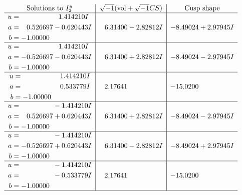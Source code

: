 \documentclass[1p]{elsarticle_modified}
\theoremstyle{definition}
\newcommand{\I}{\sqrt{-1}}
\begin{document}
$$\begin{array}{c|c|c}  
\text{Solutions to }I^u_{2}& \I (\text{vol} + \sqrt{-1}CS) & \text{Cusp shape}\\
 \hline 
\begin{aligned}
u &= \phantom{-0.000000 -}1.414210 I \\
a &= \phantom{-}0.526697 - 0.620443 I \\
b &= -1.00000\phantom{ +0.000000I}\end{aligned}
 & \phantom{-}6.31400 - 2.82812 I & -8.49024 + 2.97945 I \\ \hline\begin{aligned}
u &= \phantom{-0.000000 -}1.414210 I \\
a &= -0.526697 - 0.620443 I \\
b &= -1.00000\phantom{ +0.000000I}\end{aligned}
 & \phantom{-}6.31400 + 2.82812 I & -8.49024 - 2.97945 I \\ \hline\begin{aligned}
u &= \phantom{-0.000000 -}1.414210 I \\
a &= \phantom{-0.000000 -}0.533779 I \\
b &= -1.00000\phantom{ +0.000000I}\end{aligned}
 & \phantom{-}2.17641\phantom{ +0.000000I} & -15.0200\phantom{ +0.000000I} \\ \hline\begin{aligned}
u &= \phantom{-0.000000 } -1.414210 I \\
a &= \phantom{-}0.526697 + 0.620443 I \\
b &= -1.00000\phantom{ +0.000000I}\end{aligned}
 & \phantom{-}6.31400 + 2.82812 I & -8.49024 - 2.97945 I \\ \hline\begin{aligned}
u &= \phantom{-0.000000 } -1.414210 I \\
a &= -0.526697 + 0.620443 I \\
b &= -1.00000\phantom{ +0.000000I}\end{aligned}
 & \phantom{-}6.31400 - 2.82812 I & -8.49024 + 2.97945 I \\ \hline\begin{aligned}
u &= \phantom{-0.000000 } -1.414210 I \\
a &= \phantom{-0.000000 } -0.533779 I \\
b &= -1.00000\phantom{ +0.000000I}\end{aligned}
 & \phantom{-}2.17641\phantom{ +0.000000I} & -15.0200\phantom{ +0.000000I}\\
 \hline 
 \end{array}$$\newpage\newpage\renewcommand{\arraystretch}{1}
\end{document}
